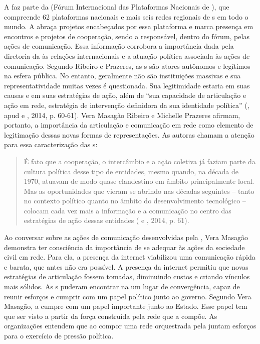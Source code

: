 A  faz parte da  (Fórum Internacional das Plataformas Nacionais
de ), que compreende 62 plataformas nacionais e mais seis redes
regionais de s em todo o mundo. A  abraça projetos encabeçados
por essa plataforma e marca presença em encontros e projetos de
cooperação, sendo a responsável, dentro do fórum, pelas ações de
comunicação. Essa informação corrobora a importância dada pela diretoria
da  às relações internacionais e a atuação política associada às
ações de comunicação. Segundo Ribeiro e Prazeres, as s são atores
autônomos e legítimos na esfera pública. No entanto, geralmente não são
instituições massivas e sua representatividade muitas vezes é
questionada. Sua legitimidade estaria em suas causas e em suas
estratégias de ação, além de ``sua capacidade de articulação e ação em
rede, estratégia de intervenção definidora da sua identidade política''
(, apud  e , 2014, p. 60-61). Vera
Masagão Ribeiro e Michelle Prazeres afirmam, portanto, a importância da
articulação e comunicação em rede como elemento de legitimação dessas
novas formas de representações. As autoras chamam a atenção para essa
caracterização das s:

\begin{quote}
É fato que a cooperação, o intercâmbio e a ação coletiva já faziam parte
da cultura política desse tipo de entidades, mesmo quando, na década de
1970, atuavam de modo quase clandestino em âmbito principalmente local.
Mas as oportunidades que vieram se abrindo nas décadas seguintes --
tanto no contexto político quanto no âmbito do desenvolvimento
tecnológico -- colocam cada vez mais a informação e a comunicação no
centro das estratégias de ação dessas entidades ( e ,
2014, p. 61).
\end{quote}

Ao conversar sobre as ações de comunicação desenvolvidas pela ,
Vera Masagão demonstra ter consciência da importância de se adequar às
ações da sociedade civil em rede. Para ela, a presença da internet
viabilizou uma comunicação rápida e barata, que antes não era possível.
A presença da internet permitiu que novas estratégias de articulação
fossem tomadas, diminuindo custos e criando vínculos mais sólidos. As
s puderam encontrar na  um lugar de convergência, capaz de
reunir esforços e cumprir com um papel político junto ao governo.
Segundo Vera Masagão, a  cumpre com um papel importante junto ao
Estado. Esse papel tem que ser visto a partir da força construída pela
rede que a compõe. As organizações entendem que ao compor uma rede
orquestrada pela  juntam esforços para o exercício de pressão
política.

